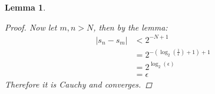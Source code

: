\documentclass{article}
\newtheorem*{lemma}{Lemma}
\begin{document}
\begin{enumerate}
\begin{lemma}
\begin{proof}
            Now let $m,n > N$, then by the lemma:
            \begin{align*}
                |s_{n} - s_{m}| &< 2^{-N+1} \\
                &= 2^{-(\log_2(\frac{1}{\epsilon}) + 1 ) + 1} \\
                &= 2^{\log_2(\epsilon)} \\
                &= \epsilon
            \end{align*}
            Therefore it is Cauchy and converges.
        \end{proof}
    \end{lemma}

\end{enumerate}
\end{document}
